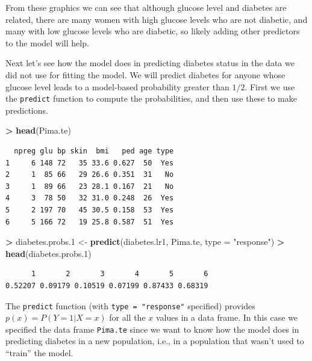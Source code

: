 \documentclass[]{krantz}
\makeatletter
\newenvironment{Shaded}{\begin{snugshade}}{\end{snugshade}}
\newcommand{\DataTypeTok}[1]{\textcolor[rgb]{0.27,0.27,0.27}{#1}}
\newcommand{\FloatTok}[1]{\textcolor[rgb]{0.06,0.06,0.06}{#1}}
\newcommand{\KeywordTok}[1]{\textcolor[rgb]{0.27,0.27,0.27}{\textbf{#1}}}
\newcommand{\NormalTok}[1]{#1}
\newcommand{\OperatorTok}[1]{\textcolor[rgb]{0.43,0.43,0.43}{\textbf{#1}}}
\newcommand{\StringTok}[1]{\textcolor[rgb]{0.5,0.5,0.5}{#1}}
\newenvironment{kframe}{%
\medskip{}
\setlength{\fboxsep}{.8em}
 \def\at@end@of@kframe{}%
 \ifinner\ifhmode%
  \def\at@end@of@kframe{\end{minipage}}%
  \begin{minipage}{\columnwidth}%
 \fi\fi%
 \def\FrameCommand##1{\hskip\@totalleftmargin \hskip-\fboxsep
 \colorbox{shadecolor}{##1}\hskip-\fboxsep
     \hskip-\linewidth \hskip-\@totalleftmargin \hskip\columnwidth}%
 \MakeFramed {\advance\hsize-\width
   \@totalleftmargin\z@ \linewidth\hsize
   \@setminipage}}%
 {\par\unskip\endMakeFramed%
 \at@end@of@kframe}
\renewenvironment{Shaded}{\begin{kframe}}{\end{kframe}}
\makeatother
\begin{document}
From these graphics we can see that although glucose level and diabetes are related, there are many women with high glucose levels who are not diabetic, and many with low glucose levels who are diabetic, so likely adding other predictors to the model will help.

Next let's see how the model does in predicting diabetes status in the data we did not use for fitting the model. We will predict diabetes for anyone whose glucose level leads to a model-based probability greater than \(1/2\). First we use the \texttt{predict} function to compute the probabilities, and then use these to make predictions.

\begin{Shaded}
\begin{Highlighting}[]
\OperatorTok{>}\StringTok{ }\KeywordTok{head}\NormalTok{(Pima.te)}
\end{Highlighting}
\end{Shaded}

\begin{verbatim}
  npreg glu bp skin  bmi   ped age type
1     6 148 72   35 33.6 0.627  50  Yes
2     1  85 66   29 26.6 0.351  31   No
3     1  89 66   23 28.1 0.167  21   No
4     3  78 50   32 31.0 0.248  26  Yes
5     2 197 70   45 30.5 0.158  53  Yes
6     5 166 72   19 25.8 0.587  51  Yes
\end{verbatim}

\begin{Shaded}
\begin{Highlighting}[]
\OperatorTok{>}\StringTok{ }\NormalTok{diabetes.probs}\FloatTok{.1}\NormalTok{ <-}\StringTok{ }\KeywordTok{predict}\NormalTok{(diabetes.lr1, Pima.te, }\DataTypeTok{type =} \StringTok{"response"}\NormalTok{)}
\OperatorTok{>}\StringTok{ }\KeywordTok{head}\NormalTok{(diabetes.probs}\FloatTok{.1}\NormalTok{)}
\end{Highlighting}
\end{Shaded}

\begin{verbatim}
      1       2       3       4       5       6 
0.52207 0.09179 0.10519 0.07199 0.87433 0.68319 
\end{verbatim}

The \texttt{predict} function (with \texttt{type\ =\ "response"} specified) provides \(p(x) = P(Y = 1 | X = x)\) for all the \(x\) values in a data frame. In this case we specified the data frame \texttt{Pima.te} since we want to know how the model does in predicting diabetes in a new population, i.e., in a population that wasn't used to ``train'' the model.
\end{document}
